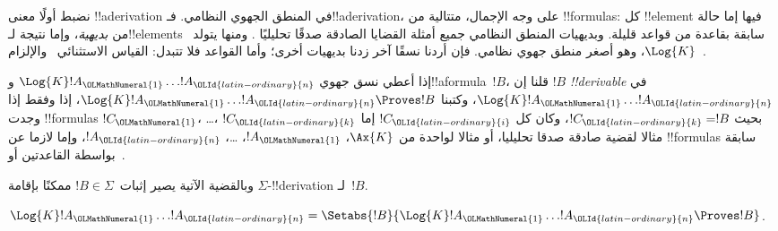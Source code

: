 \documentclass[../../../include/open-logic-section]{subfiles}
\begin{document}


نضبط أولًا معنى !!a{derivation} في المنطق الجهوي النظامي.
فـ!!a{derivation}، على وجه الإجمال، متتالية من !!{formula}s:
كل !!{element} فيها إما حالة من \emph{بديهية}، وإما نتيجة
لـ!!{element}s سابقة بقاعدة من قواعد قليلة.
وبديهيات المنطق النظامي جميع أمثلة القضايا الصادقة صدقًا تحليليًا
.
ومنها يتولد~$\Log{K}$، وهو أصغر منطق جهوي نظامي. فإن أردنا
نسقًا آخر زدنا بديهيات أخرى؛ وأما القواعد فلا تتبدل:
القياس الاستثنائي~\MP{} والإلزام~\Nec.

\begin{defn}
  إذا أعطي نسق جهوي $\Log{K} !A_\OLMathNumeral{1} \dots !A_\OLId{latin-ordinary}{n}$ و!!a{formula}~$!B$،
  قلنا إن $!B$ \emph{!!{derivable}} في $\Log{K} !A_\OLMathNumeral{1} \dots
  !A_\OLId{latin-ordinary}{n}$، وكتبنا $\Log{K} !A_\OLMathNumeral{1} \dots !A_\OLId{latin-ordinary}{n} \Proves !B$، إذا وفقط إذا
  وجدت !!{formula}s $!C_\OLMathNumeral{1}$، \dots، $!C_\OLId{latin-ordinary}{k}$ بحيث $!C_\OLId{latin-ordinary}{k} = !B$، وكان كل
  $!C_\OLId{latin-ordinary}{i}$ إما مثالا لقضية صادقة صدقا تحليليا، أو مثالا لواحدة من
  $\Ax{K}$، $!A_\OLMathNumeral{1}$، \dots، $!A_\OLId{latin-ordinary}{n}$،
  وإما لازما عن !!{formula}s سابقة بواسطة القاعدتين \MP{} أو~\Nec.
\end{defn}

وبالقضية الآتية يصير إثبات~$!B \in \Sigma$ ممكنًا بإقامة
$\Sigma$-!!{derivation} لـ~$!B$.

\begin{prop}
  $\Log{K} !A_\OLMathNumeral{1} \dots !A_\OLId{latin-ordinary}{n} = \Setabs{!B}{\Log{K} !A_\OLMathNumeral{1} \dots !A_\OLId{latin-ordinary}{n} \Proves !B}$.
\end{prop}
\end{document}
